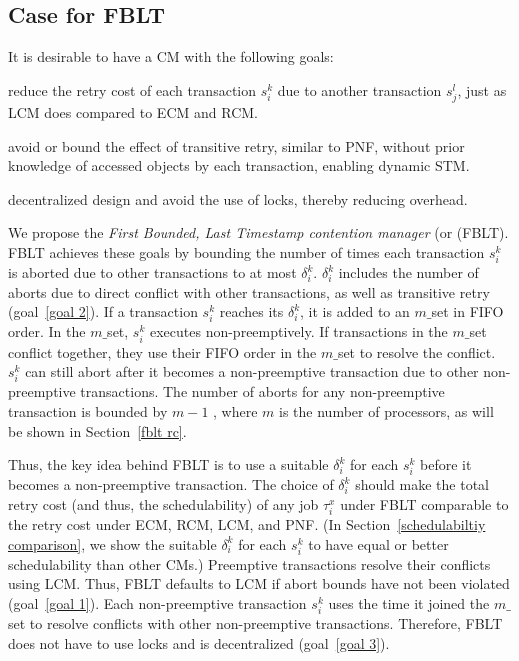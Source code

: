 \documentclass[a4paper,english]{article}
\begin{document}
\subsection{Case for FBLT}

It is desirable to have a CM with the following goals:
\begin{compactenum}
\item \label{goal 1} reduce the retry cost of each transaction $s_i^k$ due to another transaction $s_j^l$, just as LCM does compared to ECM and RCM.
\item \label{goal 2} avoid or bound the effect of transitive retry, similar to PNF, without prior knowledge of accessed objects by each transaction, enabling dynamic STM.
\item \label{goal 3} decentralized design and avoid the use of locks, thereby reducing  overhead.
\end{compactenum}

We propose the \textit{First Bounded, Last Timestamp contention manager} (or (FBLT). FBLT achieves these goals by bounding the number of times each transaction $s_i^k$ is aborted due to other transactions to at most $\delta_i^k$. $\delta_i^k$ includes the number of aborts due to direct conflict with other transactions, as well as transitive retry (goal~\ref{goal 2}). If a transaction $s_i^k$ reaches its $\delta_i^k$, it is added to an $m\_$set in FIFO order. In the $m\_$set, $s_i^k$ executes non-preemptively. If transactions in the $m\_$set conflict together, they use their FIFO order in the $m\_$set to resolve the conflict. $s_i^k$ can still abort after it becomes a non-preemptive transaction due to other non-preemptive transactions. The number of aborts for any non-preemptive transaction is bounded by $m-1$ , where $m$ is the number of processors, as will be shown in Section~\ref{fblt rc}. 

Thus, the key idea behind FBLT is to use a suitable $\delta_i^k$ for each $s_i^k$ before it becomes a non-preemptive transaction. The choice of $\delta_i^k$ should make the total retry cost (and thus, the schedulability) of any job $\tau_i^x$ under FBLT comparable to the retry cost under ECM, RCM, LCM, and PNF. (In Section~\ref{schedulabiltiy comparison}, we show the suitable $\delta_i^k$ for each $s_i^k$ to have equal or better schedulability than other CMs.) Preemptive transactions resolve their conflicts using LCM.  Thus, FBLT defaults to LCM if abort bounds have not been violated (goal~\ref{goal 1}). Each non-preemptive transaction $s_i^k$  uses the time it joined the $m\_$set to resolve conflicts with other non-preemptive transactions. Therefore, FBLT does not have to use locks and is decentralized (goal~\ref{goal 3}).
\end{document}
